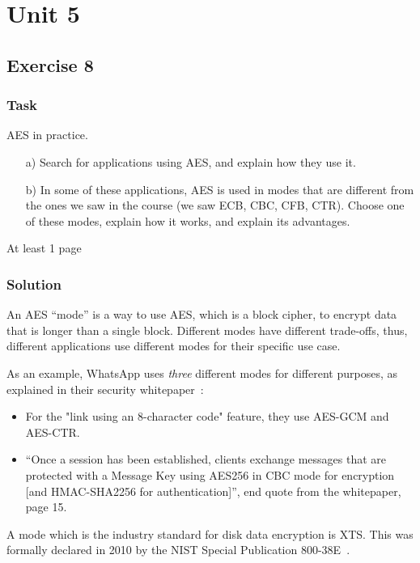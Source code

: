 \chapter{Unit 5}
\section{Exercise 8}

\subsection{Task}
AES in practice.

\begin{enumerate}
    \item[a)] Search for applications using AES, and explain how they use it.
    \item[b)] In some of these applications, AES is used in modes that are different from the ones we saw in the course (we saw ECB, CBC, CFB, CTR). Choose one of these modes, explain how it works, and explain its advantages.
\end{enumerate}

At least 1 page

\subsection{Solution}

An AES ``mode'' is a way to use AES, which is a block cipher, to encrypt data that is longer than a single block.
Different modes have different trade-offs, thus, different applications use different modes for their specific use case.

As an example, WhatsApp uses \textit{three} different modes for different purposes, as explained in their security whitepaper~\cite{whatsapp}:
\begin{itemize}
    \item For the "link using an 8-character code" feature, they use AES-GCM and AES-CTR.
    \item ``Once a session has been established, clients exchange messages that are protected with a Message Key using AES256 in CBC mode for encryption [and HMAC-SHA2256 for authentication]'', end quote from the whitepaper, page 15.
\end{itemize}

A mode which is the industry standard for disk data encryption is XTS\@.
This was formally declared in 2010 by the NIST Special Publication 800-38E~\cite{NIST-XTS}.

